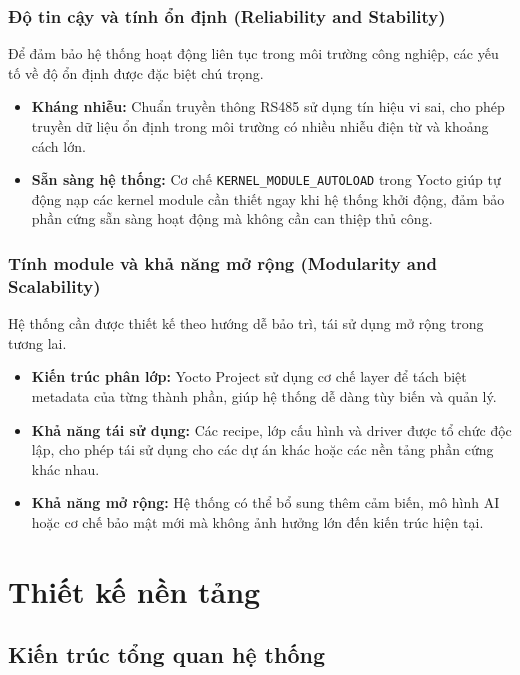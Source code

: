 \subsubsection{Độ tin cậy và tính ổn định (Reliability and Stability)}

Để đảm bảo hệ thống hoạt động liên tục trong môi trường công nghiệp, các yếu tố về độ ổn định được đặc biệt chú trọng.

\begin{itemize}
    \item \textbf{Kháng nhiễu:}
Chuẩn truyền thông RS485 sử dụng tín hiệu vi sai, cho phép truyền dữ liệu ổn định trong môi trường có nhiều nhiễu điện từ và khoảng cách lớn.

    \item \textbf{Sẵn sàng hệ thống:}  
    Cơ chế \texttt{KERNEL\_MODULE\_AUTOLOAD} trong Yocto giúp tự động nạp các kernel module cần thiết ngay khi hệ thống khởi động, đảm bảo phần cứng sẵn sàng hoạt động mà không cần can thiệp thủ công.
\end{itemize}

\subsubsection{Tính module và khả năng mở rộng (Modularity and Scalability)}

Hệ thống cần được thiết kế theo hướng dễ bảo trì, tái sử dụng mở rộng trong tương lai.

\begin{itemize}
    \item \textbf{Kiến trúc phân lớp:}  
    Yocto Project sử dụng cơ chế layer để tách biệt metadata của từng thành phần, giúp hệ thống dễ dàng tùy biến và quản lý.

    \item \textbf{Khả năng tái sử dụng:}  
    Các recipe, lớp cấu hình và driver được tổ chức độc lập, cho phép tái sử dụng cho các dự án khác hoặc các nền tảng phần cứng khác nhau.

    \item \textbf{Khả năng mở rộng:}  
    Hệ thống có thể bổ sung thêm cảm biến, mô hình AI hoặc cơ chế bảo mật mới mà không ảnh hưởng lớn đến kiến trúc hiện tại.
\end{itemize}

\section{Thiết kế nền tảng} 
\subsection{Kiến trúc tổng quan hệ thống}


